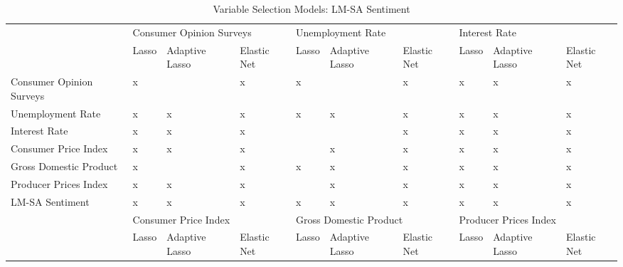 \begin{landscape}


\begin{table}[]
\caption{Variable Selection Models: LM-SA Sentiment}
\label{tab:selectionlm}
\begin{adjustbox}{max width=\linewidth}
\begin{tabular}{llllllllll}
\hline
                         & \multicolumn{3}{l}{Consumer Opinion Surveys} & \multicolumn{3}{l}{Unemployment Rate}      & \multicolumn{3}{l}{Interest Rate}         \\
                         & Lasso    & Adaptive Lasso    & Elastic Net   & Lasso    & Adaptive Lasso   & Elastic Net  & Lasso   & Adaptive Lasso   & Elastic Net  \\
Consumer Opinion Surveys & x        &                   & x             & x        &                  & x            & x       & x                & x            \\
Unemployment Rate        & x        & x                 & x             & x        & x                & x            & x       & x                & x            \\
Interest Rate            & x        & x                 & x             &          &                  & x            & x       & x                & x            \\
Consumer Price Index     & x        & x                 & x             &          & x                & x            & x       & x                & x            \\
Gross Domestic Product   & x        &                   & x             & x        & x                & x            & x       & x                & x            \\
Producer Prices Index    & x        & x                 & x             &          & x                & x            & x       & x                & x            \\ \hline
LM-SA Sentiment          & x        & x                 & x             & x        & x                & x            & x       & x                & x            \\ \hline
                         & \multicolumn{3}{l}{Consumer Price Index}     & \multicolumn{3}{l}{Gross Domestic Product} & \multicolumn{3}{l}{Producer Prices Index} \\
                         & Lasso    & Adaptive Lasso    & Elastic Net   & Lasso    & Adaptive Lasso   & Elastic Net  & Lasso   & Adaptive Lasso   & Elastic Net  \\

\end{tabular}
\end{adjustbox}
\end{table}
\end{landscape}
